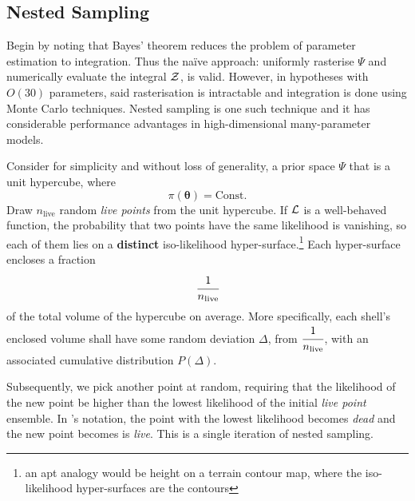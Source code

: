\documentclass[usenatbib]{mnras}
\begin{document}
\subsection{Nested Sampling}
\label{sec:org83f823a}

Begin by noting that Bayes' theorem reduces the problem of
parameter estimation to integration. Thus the naïve approach:
uniformly rasterise \(\Psi\) and numerically evaluate the integral
\({\cal Z}\), is valid. However, in hypotheses with \(O(30)\)
parameters, said rasterisation is intractable \citep{Caflisch_1998}
and integration is done using Monte Carlo techniques. Nested
sampling is one such technique and it has considerable performance
advantages in high-dimensional many-parameter models.

Consider for simplicity and without loss of generality, a prior
space \(\Psi\) that is a unit hypercube, where \[\pi(\bm{\theta})
   = \text{Const.}\] Draw \(n_\text{live}\) random \emph{live points} from
the unit hypercube. If \({\cal L}\) is a well-behaved function, the
probability that two points have the same likelihood is vanishing,
so each of them lies on a \textbf{distinct} iso-likelihood
hyper-surface.\footnote{an apt analogy would be height on a terrain
contour map, where the iso-likelihood hyper-surfaces are the
contours} Each hyper-surface encloses a fraction
\begin{equation}
\cfrac{1}{n_\text{live}}
\end{equation}
of the total volume of the hypercube on average. More specifically,
each shell's enclosed volume shall have some random deviation \(\Delta\), from
\(\cfrac{1}{n_\text{live}}\), with an associated cumulative
distribution \(P(\Delta)\).

Subsequently, we pick another point at random, requiring that the
likelihood of the new point be higher than the lowest likelihood of
the initial \emph{live point} ensemble. In \citeauthor{Skilling2006} 's
notation, the point with the lowest likelihood becomes \emph{dead} and
the new point becomes is \emph{live}. This is a single iteration of
nested sampling.
\end{document}
